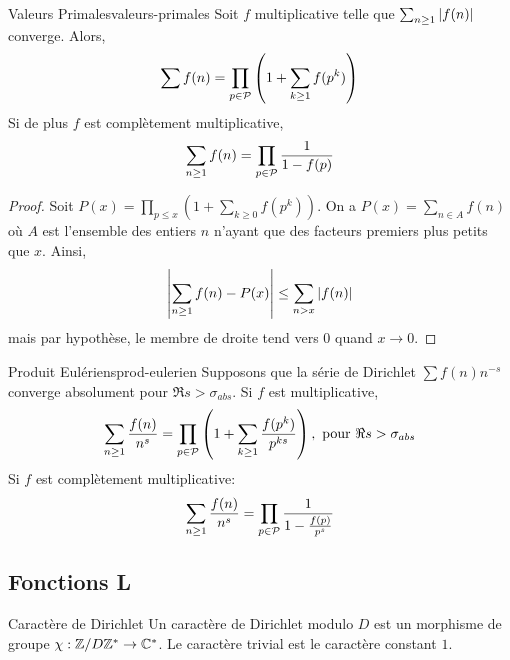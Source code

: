 \documentclass{cours}
\begin{document}
\begin{lemme}
	{Valeurs Primales}{valeurs-primales}
	Soit $f$ multiplicative telle que $\sum_{n \geq 1}\left|f(n)\right|$ converge. Alors, 
	\begin{equation*}
		\sum f(n) = \prod_{p \in \mathcal{P}}\left(1 + \sum_{k \geq 1} f(p^{k})\right)
	\end{equation*}
	Si de plus $f$ est complètement multiplicative, 
	\begin{equation*}
		\sum_{n \geq 1} f(n) = \prod_{p \in \mathcal{P}} \frac{1}{1 - f(p)}
	\end{equation*}
\end{lemme}
\begin{proof}
	Soit $P(x) = \prod_{p \leq x}\left( 1 + \sum_{k \geq 0} f(p^{k})\right)$. On a $P(x) = \sum_{n \in A}f(n)$ où $A$ est l'ensemble des entiers $n$ n'ayant que des facteurs premiers plus petits que $x$. Ainsi, 
	\begin{equation*}
		\left|\sum_{n \geq 1} f(n) - P(x)\right| \leq \sum_{n > x}\left|f(n)\right|
	\end{equation*}
	mais par hypothèse, le membre de droite tend vers $0$ quand $x \to 0$. 
\end{proof}

\begin{théorème}
	{Produit Eulériens}{prod-eulerien}
	Supposons que la série de Dirichlet $\sum f(n)n^{-s}$ converge absolument pour $\Re s > \sigma_{abs}$. Si $f$ est multiplicative, 
	\begin{equation*}
		\sum_{n \geq 1}\frac{f(n)}{n^{s}} = \prod_{p \in \mathcal{P}}\left(1  + \sum_{k \geq 1}\frac{f(p^{k})}{p^{ks}}\right), \text{ pour } \Re s > \sigma_{abs}
	\end{equation*}
	Si $f$ est complètement multiplicative: 
	\begin{equation*}
		\sum_{n \geq 1}\frac{f(n)}{n^{s}} = \prod_{p \in \mathcal{P}}\frac{1}{1 - \frac{f(p)}{p^{s}}}
	\end{equation*}
\end{théorème}

\subsection{Fonctions L}
\begin{définition}
	{Caractère de Dirichlet}{}
	Un caractère de Dirichlet modulo $D$ est un morphisme de groupe $\chi: \mathbb{Z}/D\mathbb{Z}^{*} \to \mathbb{C}^{*}$. Le caractère trivial est le caractère constant $1$. 
\end{définition}
\end{document}

